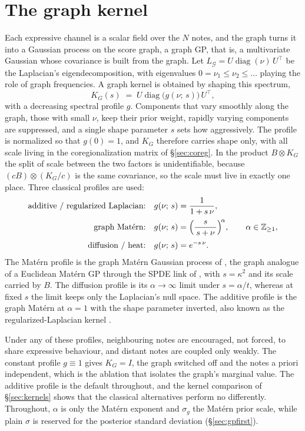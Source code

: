 \documentclass[11pt,a4paper]{report}
\newcommand{\graph}{\mathcal{G}}
\newcommand{\Lg}{L_{\graph}}
\newcommand{\diag}{\operatorname{diag}}
\begin{document}
\section{The graph kernel}\label{sec:graphgp}
Each expressive channel is a scalar field over the $N$ notes, and the graph
turns it into a Gaussian process on the score graph, a graph GP, that is, a
multivariate Gaussian whose covariance is built from the graph. Let
$\Lg = U \diag(\nu)\, U^\top$ be the Laplacian's eigendecomposition, with
eigenvalues $0 = \nu_1 \le \nu_2 \le \dots$ playing the role of graph
frequencies. A graph kernel is obtained by shaping this spectrum,
\begin{equation}
  K_G(s) \;=\; U \operatorname{diag}\bigl(g(\nu;\, s)\bigr)\, U^\top,
  \label{eq:spectral}
\end{equation}
with a decreasing spectral profile $g$. Components that vary smoothly along
the graph, those with small $\nu$, keep their prior weight, rapidly varying
components are suppressed, and a single shape parameter $s$ sets how
aggressively. The profile is normalized so that $g(0) = 1$, and $K_G$
therefore carries shape only, with all scale living in the coregionalization
matrix of \S\ref{sec:coreg}. In the product $B \otimes K_G$ the split of scale between the
two factors is unidentifiable, because $(cB) \otimes (K_G/c)$ is the same
covariance, so the scale must live in exactly one place. Three classical
profiles are used:
\begin{align}
  \text{additive / regularized Laplacian:}\quad & g(\nu;\, s) = \frac{1}{1 + s\,\nu},
  \label{eq:additive}\\[2pt]
  \text{graph Mat\'ern:}\quad & g(\nu;\, s) = \Bigl(\frac{s}{\,s + \nu\,}\Bigr)^{\!\alpha},
  \qquad \alpha \in \mathbb{Z}_{\ge 1},
  \label{eq:matern}\\[2pt]
  \text{diffusion / heat:}\quad & g(\nu;\, s) = e^{-s\,\nu}.
  \label{eq:diffusion}
\end{align}
The Mat\'ern profile is the graph Mat\'ern Gaussian process of
\cite{borovitskiy2021}, the graph analogue of a Euclidean Mat\'ern GP
through the SPDE link of \cite{lindgren2011}, with $s = \kappa^2$ and its
scale carried by $B$. The diffusion profile is its $\alpha \to \infty$ limit
under $s = \alpha/t$, whereas at fixed $s$ the limit keeps only the
Laplacian's null space. The additive profile is the graph Mat\'ern at
$\alpha = 1$ with the shape parameter inverted, also known as the
regularized-Laplacian kernel \cite{smolakondor2003}.

Under any of these profiles, neighbouring notes are encouraged, not forced,
to share expressive behaviour, and distant notes are coupled only weakly.
The constant profile $g \equiv 1$ gives $K_G = I$, the graph switched off
and the notes a priori independent, which is the ablation that isolates the
graph's marginal value. The additive profile is the default throughout, and
the kernel comparison of \S\ref{sec:kernels} shows that the classical
alternatives perform no differently. Throughout, $\alpha$ is only the
Mat\'ern exponent and $\sigma_g$ the Mat\'ern prior scale, while plain
$\sigma$ is reserved for the posterior standard deviation
(\S\ref{sec:gpfirst}).
\end{document}
